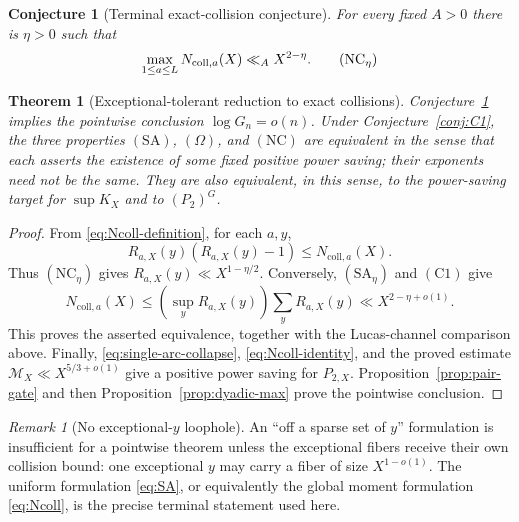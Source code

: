 \documentclass[11pt]{amsart}
\theoremstyle{plain}
\newtheorem{theorem}{Theorem}
\newtheorem{conjecture}{Conjecture}
\theoremstyle{remark}
\newtheorem{remark}{Remark}
\begin{document}
\begin{conjecture}[Terminal exact-collision conjecture]
\label{conj:Ncoll}
For every fixed $A>0$ there is $\eta>0$ such that
\[
 \max_{1\leq a\leq L}N_{\mathrm{coll},a}(X)
 \ll_A X^{2-\eta}.
 \tag{$\mathrm{NC}_\eta$}\label{eq:Ncoll}
\]
\end{conjecture}

\begin{theorem}[Exceptional-tolerant reduction to exact collisions]
\label{thm:exact-collision-reduction}
Conjecture~\ref{conj:Ncoll} implies the pointwise conclusion
$\log G_n=o(n)$.  Under Conjecture~\ref{conj:C1}, the three properties
$(\mathrm{SA})$, $(\Omega)$, and $(\mathrm{NC})$ are equivalent in the
sense that each asserts the existence of some fixed positive power
saving; their exponents need not be the same.  They are also equivalent,
in this sense, to the power-saving target for $\sup K_X$ and to
$(P_2)^G$.
\end{theorem}

\begin{proof}
From \eqref{eq:Ncoll-definition}, for each $a,y$,
\[
 R_{a,X}(y)(R_{a,X}(y)-1)
 \leq N_{\mathrm{coll},a}(X).
\]
Thus $(\mathrm{NC}_\eta)$ gives
$R_{a,X}(y)\ll X^{1-\eta/2}$.  Conversely, $(\mathrm{SA}_\eta)$ and
$(\mathrm C1)$ give
\[
 N_{\mathrm{coll},a}(X)
 \leq(\sup_yR_{a,X}(y))\sum_yR_{a,X}(y)
 \ll X^{2-\eta+o(1)}.
\]
This proves the asserted equivalence, together with the Lucas-channel
comparison above.  Finally, \eqref{eq:single-arc-collapse},
\eqref{eq:Ncoll-identity}, and the proved estimate
$\mathcal M_X\ll X^{5/3+o(1)}$ give a positive power saving for
$P_{2,X}$.  Proposition~\ref{prop:pair-gate} and then
Proposition~\ref{prop:dyadic-max} prove the pointwise conclusion.
\end{proof}

\begin{remark}[No exceptional-$y$ loophole]
An ``off a sparse set of $y$'' formulation is insufficient for a
pointwise theorem unless the exceptional fibers receive their own
collision bound: one exceptional $y$ may carry a fiber of size
$X^{1-o(1)}$.  The uniform formulation \eqref{eq:SA}, or equivalently
the global moment formulation \eqref{eq:Ncoll}, is the precise terminal
statement used here.
\end{remark}
\end{document}
